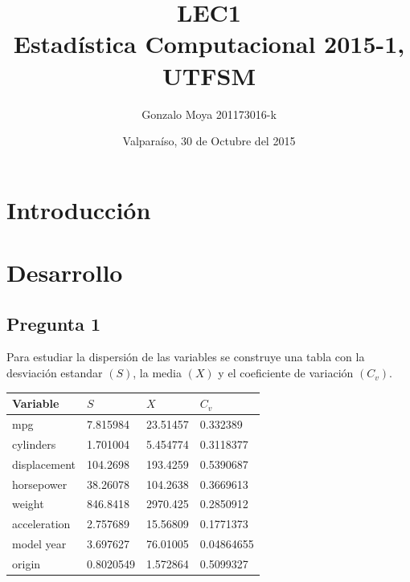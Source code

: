 \documentclass[letter,10pt]{article}
\title{LEC1 \\ Estadística Computacional 2015-1, UTFSM }
\author{Gonzalo Moya 201173016-k}
\date{\vspace*{1cm} Valparaíso, 30 de Octubre del 2015}
\begin{document}
\maketitle
\thispagestyle{empty}
\newpage
\tableofcontents

\makeatother

\newpage

\section{Introducción}
\section{Desarrollo}
\subsection{Pregunta 1}

Para estudiar la dispersión de las variables se construye una tabla con la desviación estandar $(S)$, la media $(X)$ y el coeficiente
de variación $(C_v)$.

\begin{table}[h]
    \begin{center}
    \begin{tabular}{|l|l|l|l|}
    \hline
    Variable     & $S$ & $X$ & $C_{v}$ \\ \hline
    mpg          & 7.815984 & 23.51457 & 0.332389 \\
    cylinders    & 1.701004 & 5.454774 & 0.3118377 \\
    displacement & 104.2698 & 193.4259 & 0.5390687 \\
    horsepower   & 38.26078 & 104.2638 & 0.3669613 \\
    weight       & 846.8418 & 2970.425 & 0.2850912 \\
    acceleration & 2.757689 & 15.56809 & 0.1771373 \\
    model year   & 3.697627 & 76.01005 & 0.04864655 \\
    origin       & 0.8020549 & 1.572864 & 0.5099327 \\ \hline
    \end{tabular}
    \end{center}
\end{table}
\end{document}
